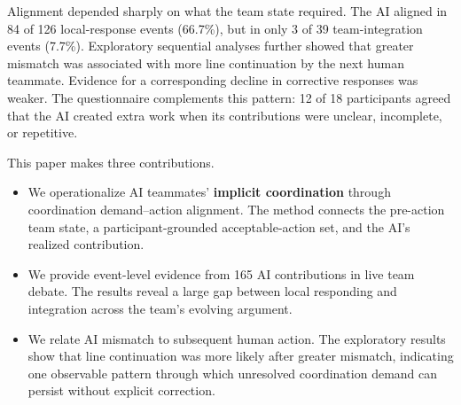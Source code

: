 \documentclass[manuscript,review,anonymous]{acmart}
\begin{document}
Alignment depended sharply on what the team state required. The AI aligned in 84 of 126 local-response events (66.7\%), but in only 3 of 39 team-integration events (7.7\%). Exploratory sequential analyses further showed that greater mismatch was associated with more line continuation by the next human teammate. Evidence for a corresponding decline in corrective responses was weaker. The questionnaire complements this pattern: 12 of 18 participants agreed that the AI created extra work when its contributions were unclear, incomplete, or repetitive.

This paper makes three contributions.

\begin{itemize}
  \item We operationalize AI teammates' \textbf{implicit coordination} through coordination demand--action alignment. The method connects the pre-action team state, a participant-grounded acceptable-action set, and the AI's realized contribution.

  \item We provide event-level evidence from 165 AI contributions in live team debate. The results reveal a large gap between local responding and integration across the team's evolving argument.

  \item We relate AI mismatch to subsequent human action. The exploratory results show that line continuation was more likely after greater mismatch, indicating one observable pattern through which unresolved coordination demand can persist without explicit correction.
\end{itemize}
\end{document}
